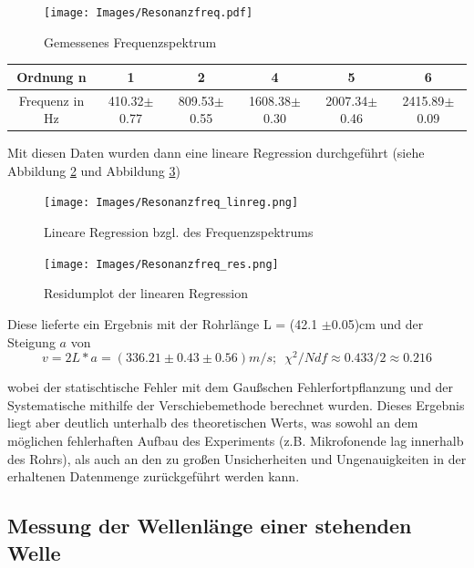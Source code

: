 \documentclass[]{article}
\begin{document}
	\begin{figure}
		\begin{center}
			\texttt{[image: Images/Resonanzfreq.pdf]}
			\caption{Gemessenes Frequenzspektrum}
			\label{Resfreq}
		\end{center}
	\end{figure}

	\begin{tabular}{|c|c|c|c|c|c|}
		\hline 
		Ordnung n&1  &2  &4  &5 &6  \\ 
		\hline 
		Frequenz in Hz& 410.32$\pm$0.77 &809.53$\pm$0.55  &1608.38$\pm$0.30  &2007.34$\pm$0.46  &2415.89$\pm$0.09  \\ 
		\hline 
	\end{tabular}

	\bigskip
	Mit diesen Daten wurden dann eine lineare Regression durchgeführt (siehe Abbildung \ref{linreg_freq} und Abbildung \ref{linreg_res})
	\begin{figure}
		\begin{center}
			\texttt{[image: Images/Resonanzfreq\_linreg.png]}
			\caption{Lineare Regression bzgl. des Frequenzspektrums}
			\label{linreg_freq}
		\end{center}
	\end{figure}
	\begin{figure}
		\begin{center}
			\texttt{[image: Images/Resonanzfreq\_res.png]}
			\caption{Residumplot der linearen Regression}
			\label{linreg_res}
		\end{center}
	\end{figure}

	Diese lieferte ein Ergebnis mit der Rohrlänge L = (42.1 $\pm$0.05)cm und der Steigung $a$ von 
	\begin{equation}
		v = 2L*a = (336.21 \pm 0.43 \pm 0.56) m/s; \, \, \, \chi^2/Ndf \approx 0.433/2 \approx 0.216
	\end{equation}
	
	wobei der statischtische Fehler mit dem Gaußschen Fehlerfortpflanzung und der Systematische mithilfe der Verschiebemethode berechnet wurden. Dieses Ergebnis liegt aber deutlich unterhalb des theoretischen Werts, was sowohl an dem möglichen fehlerhaften Aufbau des Experiments (z.B. Mikrofonende lag innerhalb des Rohrs), als auch an den zu großen Unsicherheiten und Ungenauigkeiten in der erhaltenen Datenmenge zurückgeführt werden kann.
	
	\subsection{Messung der Wellenlänge einer stehenden Welle}
\end{document}
